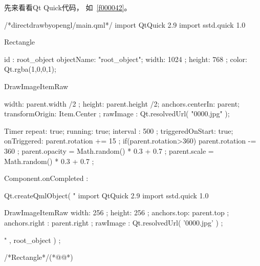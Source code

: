 先来看看Qt Quick代码，
如\filesourcenumbernameone\ \ref{f000042}。

\label{f000042}    %
\FloatBarrier                                  %
\begin{thebookfilesourceone}[escapeinside={(*@}{@*)},
caption=GoodLuck,
title=\filesourcenumbernameone \thefilesourcenumber
]
/*directdrawbyopengl/main.qml*/
import QtQuick 2.9
import sstd.quick 1.0

Rectangle{
    id : root_object
    objectName: "root_object";
    width: 1024 ;
    height: 768 ;
    color: Qt.rgba(1,0,0,1);

    DrawImageItemRaw {

        width: parent.width /2  ;
        height: parent.height /2;
        anchors.centerIn: parent;
        transformOrigin: Item.Center ;
        rawImage : Qt.resolvedUrl( "0000.jpg" );

        Timer{
            repeat: true;
            running: true;
            interval : 500 ;
            triggeredOnStart: true;
            onTriggered: {
                parent.rotation += 15 ;
                if(parent.rotation>360){
                    parent.rotation -= 360 ;
                }
                parent.opacity = Math.random() * 0.3 + 0.7 ;
                parent.scale = Math.random() * 0.3 + 0.7   ;
            }
        }

    }


    Component.onCompleted : {
        Qt.createQmlObject(
"
import QtQuick 2.9
import sstd.quick 1.0

DrawImageItemRaw {
    width: 256   ;
    height: 256  ;
    anchors.top: parent.top                 ;
    anchors.right : parent.right            ;
    rawImage : Qt.resolvedUrl( '0000.jpg' ) ;
}

" , root_object  ) ;
    }

}/*Rectangle*/(*@\marginpar[\hfill\setlength\fboxsep{2pt}\fbox{\footnotesize{\kaishu\parbox{1em}{\setlength{\baselineskip}{2pt}\filesourcenumbernameone}}\footnotesize{\thefilesourcenumber}}]{\setlength\fboxsep{2pt}\fbox{\footnotesize{\kaishu\parbox{1em}{\setlength{\baselineskip}{2pt}\filesourcenumbernameone}}\footnotesize{\thefilesourcenumber}}}@*)\end{thebookfilesourceone}          %
\addtocounter{lstlisting}{-1}   %


